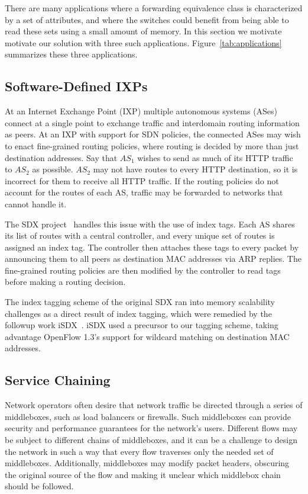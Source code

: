 There are many applications where a forwarding equivalence class is
characterized by a set of attributes, and where the switches could benefit from
being able to read these sets using a small amount of memory. In this section
we motivate motivate our solution with three such applications.
Figure~\ref{tab:applications} summarizes these three applications. 

\subsection{Software-Defined IXPs} At an Internet Exchange
Point (IXP) multiple autonomous systems (ASes) connect at a single point to
exchange traffic and interdomain routing information as peers. At an IXP with
support for SDN policies, the connected ASes may wish to enact fine-grained
routing policies, where routing is decided by more than just destination
addresses. Say that $AS_1$ wishes to send as much of its HTTP traffic to
$AS_2$ as possible. $AS_2$ may not have routes to every HTTP destination, so it
is incorrect for them to receive all HTTP traffic. If the routing policies do
not account for the routes of each AS, traffic may be forwarded to networks that
cannot handle it. 

The SDX project~\cite{sdx} handles this issue with the use of index tags. Each
AS shares its list of routes with a central controller, and every unique set of
routes is assigned an index tag. The controller then attaches these tags to
every packet by announcing them to all peers as destination MAC addresses via
ARP replies. The fine-grained routing policies are then modified by the
controller to read tags before making a routing decision. 

The index tagging scheme of the original SDX ran into memory scalability
challenges as a direct result of index tagging, which were remedied by the
followup work iSDX~\cite{isdx}. iSDX used a precursor to our tagging scheme,
taking advantage OpenFlow 1.3's support for wildcard matching on destination MAC
addresses. 

\subsection{Service Chaining} Network operators often desire that network traffic
be directed through a series of middleboxes, such as load balancers or
firewalls. Such middleboxes can provide security and performance guarantees for
the network's users. Different flows may be subject to different chains of
middleboxes, and it can be a challenge to design the network in such a way that
every flow traverses only the needed set of middleboxes. Additionally,
middleboxes may modify packet headers, obscuring the original source of the flow
and making it unclear which middlebox chain should be followed. 
 
